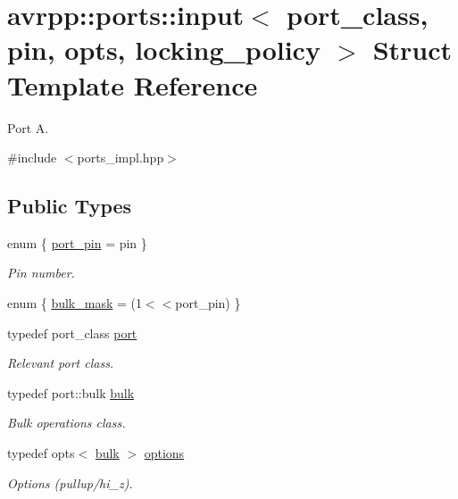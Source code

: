 \hypertarget{structavrpp_1_1ports_1_1input}{
\section{avrpp::ports::input$<$ port\_\-class, pin, opts, locking\_\-policy $>$ Struct Template Reference}
\label{structavrpp_1_1ports_1_1input}
}


Port A.  




{\ttfamily \#include $<$ports\_\-impl.hpp$>$}

\subsection*{Public Types}
\begin{DoxyCompactItemize}
\item 
enum \{ \hyperlink{structavrpp_1_1ports_1_1input_a0ec963047937dfde79ebe298aa0369aaa901102f476429ff0127f921c66bdd8f0}{port\_\-pin} = pin
 \}
\begin{DoxyCompactList}\small\item\em Pin number. \item\end{DoxyCompactList}\item 
enum \{ \hyperlink{structavrpp_1_1ports_1_1input_af2c9daae83b210070499e9cfcc8d119ea9f3c3682f9f46b5e25b657f502f32e58}{bulk\_\-mask} = (1$<$$<$port\_\-pin)
 \}
\item 
typedef port\_\-class \hyperlink{structavrpp_1_1ports_1_1input_a4f70c33283820b676b6cf50620a4a7bb}{port}
\begin{DoxyCompactList}\small\item\em Relevant port class. \item\end{DoxyCompactList}\item 
typedef port::bulk \hyperlink{structavrpp_1_1ports_1_1input_adf9cfdfcdab5c36b1cfc52d1bfd98ccc}{bulk}
\begin{DoxyCompactList}\small\item\em Bulk operations class. \item\end{DoxyCompactList}\item 
typedef opts$<$ \hyperlink{structavrpp_1_1ports_1_1input_adf9cfdfcdab5c36b1cfc52d1bfd98ccc}{bulk} $>$ \hyperlink{structavrpp_1_1ports_1_1input_a4c2883f843fd1029740bbe13a0165de8}{options}
\begin{DoxyCompactList}\small\item\em Options (pullup/hi\_\-z). \item\end{DoxyCompactList}\end{DoxyCompactItemize}
